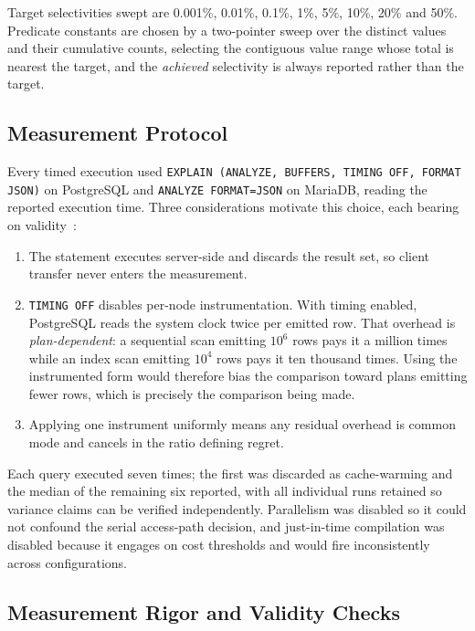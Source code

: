 \documentclass[12pt, a4paper]{article}
\begin{document}
Target selectivities swept are 0.001\%, 0.01\%, 0.1\%, 1\%, 5\%, 10\%,
20\% and 50\%. Predicate constants are chosen by a two-pointer sweep
over the distinct values and their cumulative counts, selecting the
contiguous value range whose total is nearest the target, and the
\emph{achieved} selectivity is always reported rather than the target.

\subsection{Measurement Protocol}
\label{sec:protocol}

Every timed execution used
\texttt{EXPLAIN (ANALYZE, BUFFERS, TIMING OFF, FORMAT JSON)} on
PostgreSQL and \texttt{ANALYZE FORMAT=JSON} on MariaDB, reading the
reported execution time. Three considerations motivate this choice, each
bearing on validity~\cite{raasveldt2018fair}:

\begin{enumerate}[nosep]
\item The statement executes server-side and discards the result set, so
  client transfer never enters the measurement.
\item \texttt{TIMING OFF} disables per-node instrumentation. With timing
  enabled, PostgreSQL reads the system clock twice per emitted row. That
  overhead is \emph{plan-dependent}: a sequential scan emitting $10^6$
  rows pays it a million times while an index scan emitting $10^4$ rows
  pays it ten thousand times. Using the instrumented form would
  therefore bias the comparison toward plans emitting fewer rows, which
  is precisely the comparison being made.
\item Applying one instrument uniformly means any residual overhead is
  common mode and cancels in the ratio defining regret.
\end{enumerate}

Each query executed seven times; the first was discarded as
cache-warming and the median of the remaining six reported, with all
individual runs retained so variance claims can be verified
independently. Parallelism was disabled so it could not confound the
serial access-path decision, and just-in-time compilation was disabled
because it engages on cost thresholds and would fire inconsistently
across configurations.

\subsection{Measurement Rigor and Validity Checks}
\end{document}
